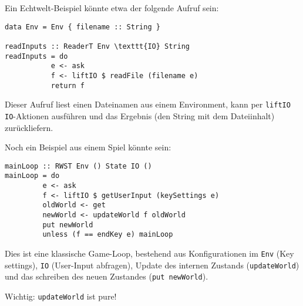 \documentclass{beamer}
\begin{document}
\begin{frame}[fragile]
Ein Echtwelt-Beispiel könnte etwa der folgende Aufruf sein:\bigskip

\begin{verbatim}
data Env = Env { filename :: String }

readInputs :: ReaderT Env \texttt{IO} String
readInputs = do
           e <- ask
           f <- liftIO $ readFile (filename e)
           return f
\end{verbatim}
\pause
Dieser Aufruf liest einen Dateinamen aus einem Environment, kann per \texttt{liftIO} \texttt{IO}-Aktionen ausführen und das Ergebnis (den String mit dem Dateiinhalt) zurückliefern.
\end{frame}

\begin{frame}[fragile]
Noch ein Beispiel aus einem Spiel könnte sein:\smallskip

\begin{verbatim}
mainLoop :: RWST Env () State IO ()
mainLoop = do
         e <- ask
         f <- liftIO $ getUserInput (keySettings e)
         oldWorld <- get
         newWorld <- updateWorld f oldWorld
         put newWorld
         unless (f == endKey e) mainLoop
\end{verbatim}
\bigskip

\pause
Dies ist eine klassische Game-Loop, bestehend aus Konfigurationen im \texttt{Env} (Key settings), \texttt{IO} (User-Input abfragen), Update des internen Zustands (\texttt{updateWorld}) und das schreiben des neuen Zustandes (\texttt{put newWorld}).\smallskip

\pause
Wichtig: \texttt{updateWorld} ist pure!
\end{frame}
\end{document}
